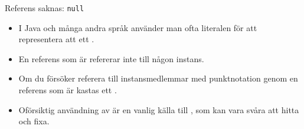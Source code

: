 %
%
%
%
%



\begin{Slide}{Referens saknas: \texttt{null}}
\begin{itemize}
\item I Java och många andra språk använder man ofta literalen  för att representera att ett .

\item En referens som är  refererar inte till någon instans.

\item Om du försöker referera till instansmedlemmar med punktnotation genom en referens som är  kastas ett  .

\item Oförsiktig användning av  är en vanlig källa till , som kan vara svåra att hitta och fixa.

\end{itemize}
\end{Slide}


